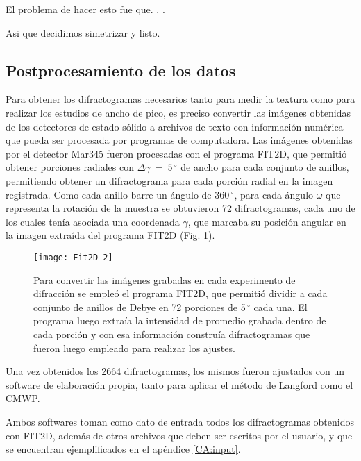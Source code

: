 El problema de hacer esto fue que. . .

Asi que decidimos simetrizar y listo.

\newpage
\subsection{Postprocesamiento de los datos}\label{SS:MatPost}
Para obtener los difractogramas necesarios tanto para medir la textura como para realizar los estudios de ancho de pico, es preciso convertir las imágenes obtenidas de los detectores de estado sólido a archivos de texto con información numérica que pueda ser procesada por programas de computadora.
Las imágenes obtenidas por el detector Mar345 fueron procesadas con el programa FIT2D\cite{FIT2D}, que permitió obtener porciones radiales con $\Delta \gamma \ = \ 5\,^{\circ}$ de ancho para cada conjunto de anillos, permitiendo obtener un difractograma para cada porción radial en la imagen registrada.
Como cada anillo barre un ángulo de 360\,$^{\circ}$, para cada ángulo $\omega$ que representa la rotación de la muestra se obtuvieron 72 difractogramas, cada uno de los cuales tenía asociada una coordenada $\gamma$, que marcaba su posición angular en la imagen extraída del programa FIT2D (Fig. \ref{fig:fit2d}).

\begin{figure}[!htb] 
  \centering
  \texttt{[image: Fit2D\_2]}
  \caption{Para convertir las imágenes grabadas en cada experimento de difracción se empleó el programa FIT2D, que permitió dividir a cada conjunto de anillos de Debye en 72 porciones de 5\,$^{\circ}$ cada una. El programa luego extraía la intensidad de promedio grabada dentro de cada porción y con esa información construía difractogramas que fueron luego empleado para realizar los ajustes.}
  \label{fig:fit2d}
\end{figure}

Una vez obtenidos los 2664 difractogramas, los mismos fueron ajustados con un software de elaboración propia, tanto para aplicar el método de Langford como el CMWP.

Ambos softwares toman como dato de entrada todos los difractogramas obtenidos con FIT2D, además de otros archivos que deben ser escritos por el usuario, y que se encuentran ejemplificados en el apéndice \ref{CA:input}.

